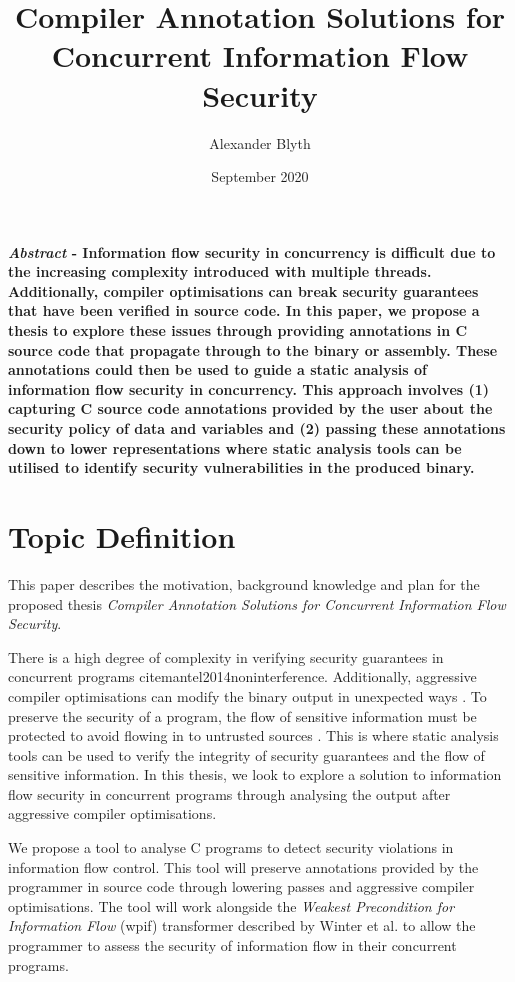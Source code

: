 \documentclass[twocolumn]{article}
\title{Compiler Annotation Solutions for Concurrent Information Flow Security}
\author{Alexander Blyth}
\date{September 2020}
\begin{document}
\maketitle


\textbf{\textit{Abstract} - Information flow security in concurrency is difficult due to the increasing complexity introduced with multiple threads. Additionally, compiler optimisations can break security guarantees that have been verified in source code. In this paper, we propose a thesis to explore these issues through providing annotations in C source code that propagate through to the binary or assembly. These annotations could then be used to guide a static analysis of information flow security in concurrency. This approach involves (1) capturing C source code annotations provided by the user about the security policy of data and variables and (2) passing these annotations down to lower representations where static analysis tools can be utilised to identify security vulnerabilities in the produced binary. }

\section{Topic Definition}
This paper describes the motivation, background knowledge and plan for the proposed thesis \textit{Compiler Annotation Solutions for Concurrent Information Flow Security}.

There is a high degree of complexity in verifying security guarantees in concurrent programs cite{mantel2014noninterference}\cite{smith2019value}\cite{vaughan2012secure}. Additionally, aggressive compiler optimisations can modify the binary output in unexpected ways \cite{d2015correctness}. To preserve the security of a program, the flow of sensitive information must be protected to avoid flowing in to untrusted sources \cite{balliu2014logics}. This is where static analysis tools can be used to verify the integrity of security guarantees and the flow of sensitive information. In this thesis, we look to explore a solution to information flow security in concurrent programs through analysing the output after aggressive compiler optimisations.

We propose a tool to analyse C programs to detect security violations in information flow control. This tool will preserve annotations provided by the programmer in source code through lowering passes and aggressive compiler optimisations. The tool will work alongside the \textit{Weakest Precondition for Information Flow} (wpif) transformer described by Winter et al. \cite{winter2020information} to allow the programmer to assess the security of information flow in their concurrent programs.
\end{document}

